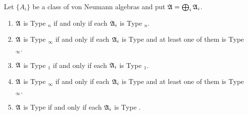 \begin{prop}
	Let $\{A_i\}$ be a class of von Neumann algebras and put $\mathfrak{A} = \bigoplus_i \mathfrak{A}_i$.
	\begin{enumerate}[label = \arabic*)]
		\item $\mathfrak{A}$ is Type $_n$ if and only if each $\mathfrak{A}_i$ is Type $_n$.
		\item $\mathfrak{A}$ is Type $_{\infty}$ if and only if each $\mathfrak{A}_i$ is Type  and at least one of them is Type $_{\infty}$.
		\item $\mathfrak{A}$ is Type $_1$ if and only if each $\mathfrak{A}_i$ is Type $_1$.
		\item $\mathfrak{A}$ is Type $_{\infty}$ if and only if each $\mathfrak{A}_i$ is Type  and at least one of them is Type $_{\infty}$.
		\item $\mathfrak{A}$ is Type  if and only if each $\mathfrak{A}_i$ is Type .
	\end{enumerate}
\end{prop}

